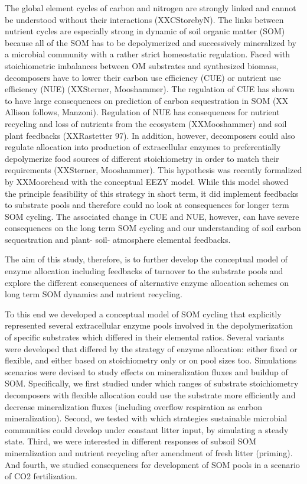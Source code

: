 \introduction  %
The global element cycles of carbon and nitrogen are strongly linked and cannot
be understood without their interactions (XXCStorebyN). The links between nutrient
cycles are especially strong in dynamic of soil organic matter (SOM) because all
of the SOM has to be depolymerized and successively mineralized by a microbial
community with a rather strict homeostatic regulation. Faced with stoichiometric
imbalances between OM substrates and synthesized biomass, decomposers have to
lower their carbon use efficiency (CUE) or nutrient use efficiency (NUE)
(XXSterner, Mooshammer). The regulation of CUE has shown to have large
consequences on prediction of carbon sequestration in SOM (XX Allison follows,
Manzoni). Regulation of NUE has consequences for nutrient recycling and loss of
nutrients from the ecosystem (XXMooshammer) and soil plant feedbacks
(XXRastetter 97). In addition, however, decomposers could also regulate
allocation into production of extracellular enzymes to preferentially
depolymerize food sources of different stoichiometry in order to match their
requirements (XXSterner, Mooshammer). This hypothesis was recently formalized by
XXMoorehead with the conceptual EEZY model. While this model showed the
principle feasibility of this strategy in short term, it did implement feedbacks
to substrate pools and therefore could no look at consequences for longer term
SOM cycling. The associated change in CUE and NUE, however, can have severe
consequences on the long term SOM cycling and our understanding of soil carbon
sequestration and plant- soil- atmosphere elemental feedbacks.

The aim of this study, therefore, is to further develop the conceptual model of
enzyme allocation including feedbacks of turnover to the substrate pools and
explore the different consequences of alternative enzyme allocation schemes on
long term SOM dynamics and nutrient recycling.

To this end we developed a conceptual model of SOM cycling that explicitly
represented several extracellular enzyme pools involved in the depolymerization
of specific substrates which differed in their elemental ratios. Several
variants were developed that differed by the strategy of enzyme allocation:
either fixed or flexible, and either based on stoichiometry only or on pool
sizes too. Simulations scenarios were devised to study effects on mineralization
fluxes and buildup of SOM. Specifically, we first studied under which ranges of
substrate stoichiometry decomposers with flexible allocation could use the
substrate more efficiently and decrease mineralization fluxes (including
overflow respiration as carbon mineralization). Second, we tested with which
strategies sustainable microbial communities could develop under constant litter
input, by simulating a steady state. Third, we were interested in different
responses of subsoil SOM mineralization and nutrient recycling after amendment
of fresh litter (priming). And fourth, we studied consequences for development
of SOM pools in a scenario of CO2 fertilization.

